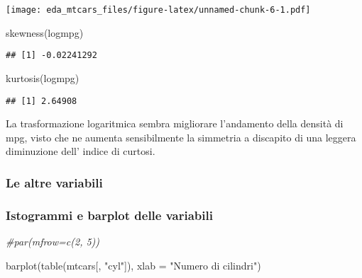 \documentclass[
]{article}
\newenvironment{Shaded}{\begin{snugshade}}{\end{snugshade}}
\newcommand{\AttributeTok}[1]{\textcolor[rgb]{0.77,0.63,0.00}{#1}}
\newcommand{\CommentTok}[1]{\textcolor[rgb]{0.56,0.35,0.01}{\textit{#1}}}
\newcommand{\FunctionTok}[1]{\textcolor[rgb]{0.00,0.00,0.00}{#1}}
\newcommand{\NormalTok}[1]{#1}
\newcommand{\OtherTok}[1]{\textcolor[rgb]{0.56,0.35,0.01}{#1}}
\newcommand{\SpecialCharTok}[1]{\textcolor[rgb]{0.00,0.00,0.00}{#1}}
\newcommand{\StringTok}[1]{\textcolor[rgb]{0.31,0.60,0.02}{#1}}
\begin{document}
\texttt{[image: eda\_mtcars\_files/figure-latex/unnamed-chunk-6-1.pdf]}

\begin{Shaded}
\begin{Highlighting}[]
\FunctionTok{skewness}\NormalTok{(logmpg)}
\end{Highlighting}
\end{Shaded}

\begin{verbatim}
## [1] -0.02241292
\end{verbatim}

\begin{Shaded}
\begin{Highlighting}[]
\FunctionTok{kurtosis}\NormalTok{(logmpg)}
\end{Highlighting}
\end{Shaded}

\begin{verbatim}
## [1] 2.64908
\end{verbatim}

La trasformazione logaritmica sembra migliorare l'andamento della
densità di mpg, visto che ne aumenta sensibilmente la simmetria a
discapito di una leggera diminuzione dell' indice di curtosi.

\begin{Shaded}
\end{Shaded}

\hypertarget{le-altre-variabili}{%
\subsubsection{Le altre variabili}\label{le-altre-variabili}}

\hypertarget{istogrammi-e-barplot-delle-variabili}{%
\subsubsection{Istogrammi e barplot delle
variabili}\label{istogrammi-e-barplot-delle-variabili}}

\begin{Shaded}
\begin{Highlighting}[]
\CommentTok{\#par(mfrow=c(2, 5))}

\FunctionTok{barplot}\NormalTok{(}\FunctionTok{table}\NormalTok{(mtcars[, }\StringTok{"cyl"}\NormalTok{]), }\AttributeTok{xlab =} \StringTok{"Numero di cilindri"}\NormalTok{)}
\end{Highlighting}
\end{Shaded}
\end{document}
